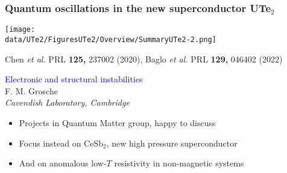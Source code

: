 \begin{emptyframe}
    \frametitle{Quantum oscillations in the new superconductor UTe$_2$}
    \centerline{ \texttt{[image: \\data/UTe2/FiguresUTe2/Overview/SummaryUTe2-2.png]}}
\vspace{-1 em}
\vfill 
\centerline{\makebox[\linewidth]{\rule{0.85\textwidth}{0.4pt}}}
\centerline{\scriptsize Chen {\it et al.} PRL {\bf 125,} 237002 (2020), Baglo {\it et al.} PRL {\bf 129,} 046402 (2022)}
\end{emptyframe}



\begin{emptyframe}
\begin{center}
\textcolor{Blue}{Electronic and structural instabilities} \\
\vspace{0.5em}
{\footnotesize F. M. Grosche} \\
{\footnotesize \em Cavendish Laboratory, Cambridge} \\
\vspace{0.1em}
\end{center}
\vspace{0.0em}

\begin{itemize}
    \item<1-> Projects in Quantum Matter group, happy to discuss
    \item<2-> Focus instead on CeSb$_2$, new high pressure superconductor
    \item<3-> And on anomalous low-$T$ resistivity in non-magnetic systems
\end{itemize}
\end{emptyframe}


